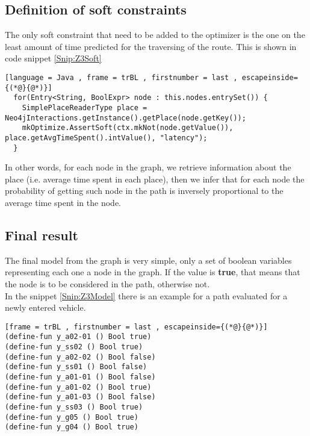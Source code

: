 \subsection{Definition of soft constraints}
The only soft constraint that need to be added to the optimizer is the one on the least amount of time predicted for the traversing of the route. This is shown in code snippet \ref{Snip:Z3Soft}
\begin{lstlisting}[language = Java , frame = trBL , firstnumber = last , escapeinside={(*@}{@*)}]
  for(Entry<String, BoolExpr> node : this.nodes.entrySet()) {
    SimplePlaceReaderType place = Neo4jInteractions.getInstance().getPlace(node.getKey());
    mkOptimize.AssertSoft(ctx.mkNot(node.getValue()), place.getAvgTimeSpent().intValue(), "latency");
  }
\end{lstlisting}\label{Snip:Z3Soft}
In other words, for each node in the graph, we retrieve information about the place (i.e. average time spent in each place), then we infer that for each node the probability of getting such node in the path is inversely proportional to the average time spent in the node.

\subsection{Final result}
The final model from the graph is very simple, only a set of boolean variables representing each one a node in the graph. If the value is \textbf{true}, that means that the node is to be considered in the path, otherwise not.\\
In the snippet \ref{Snip:Z3Model} there is an example for a path evaluated for a newly entered vehicle.
\begin{lstlisting}[frame = trBL , firstnumber = last , escapeinside={(*@}{@*)}]
(define-fun y_a02-01 () Bool true)
(define-fun y_ss02 () Bool true)
(define-fun y_a02-02 () Bool false)
(define-fun y_ss01 () Bool false)
(define-fun y_a01-01 () Bool false)
(define-fun y_a01-02 () Bool true)
(define-fun y_a01-03 () Bool false)
(define-fun y_ss03 () Bool true)
(define-fun y_g05 () Bool true)
(define-fun y_g04 () Bool true)
\end{lstlisting}\label{Snip:Z3Model}
